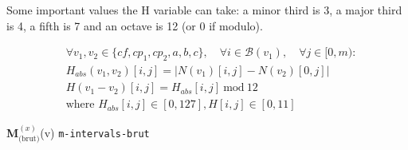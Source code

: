Some important values the H variable can take: a minor third is 3, a major third is 4, a fifth is 7 and an octave is 12 (or 0 if modulo).

\begin{equation}
\begin{aligned}
    &\forall v_1, v_2 \in \{\mathit{cf}, cp_1, cp_2, a, b, c\}, \quad \forall i \in \mathcal{B}(v_1), \quad \forall j \in [0, m):\\
    &H_{abs}(v_1,v_2)[i, j] = \left|N(v_1)[i, j] - N(v_2)[0,j]\right|\\
    &H(v_1-v_2)[i, j] = H_{abs}[i, j]\ \text{mod}\ 12\\
    &\text{where } H_{abs}[i, j] \in [0, 127], H[i, j] \in [0, 11]
\end{aligned}
\end{equation}

\vspace{.5cm}
\noindent \textbf{M}$_{\text{(brut)}}^{(x)}$(v) \hspace*{.2cm} \texttt{m-intervals-brut}

